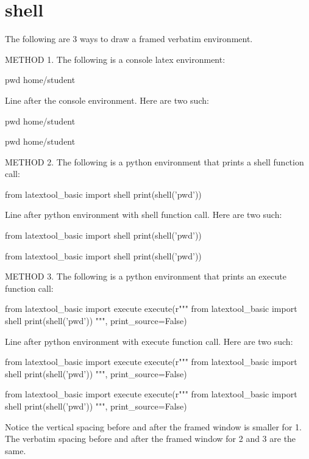 \section{shell}

The following are 3 ways to draw a framed verbatim environment.

METHOD 1.
The following is a console latex environment:
\begin{console}
 pwd
home/student
\end{console}
Line after the console environment.
Here are two such:
\begin{console}
 pwd
home/student
\end{console}
\begin{console}
 pwd
home/student
\end{console}


METHOD 2.
The following is a python environment that prints a shell function call:
\begin{python}
from latextool_basic import shell
print(shell('pwd'))
\end{python}
Line after python environment with shell function call.
Here are two such:
\begin{python}
from latextool_basic import shell
print(shell('pwd'))
\end{python}
\begin{python}
from latextool_basic import shell
print(shell('pwd'))
\end{python}

METHOD 3.
The following is a python environment that prints an execute function call:
\begin{python}
from latextool_basic import execute
execute(r"""
from latextool_basic import shell
print(shell('pwd'))
""", print_source=False)
\end{python}
Line after python environment with execute function call.
Here are two such:
\begin{python}
from latextool_basic import execute
execute(r"""
from latextool_basic import shell
print(shell('pwd'))
""", print_source=False)
\end{python}
\begin{python}
from latextool_basic import execute
execute(r"""
from latextool_basic import shell
print(shell('pwd'))
""", print_source=False)
\end{python}


Notice the vertical spacing before and after the framed window is smaller
for 1. 
The verbatim spacing before and after the framed window for 2 and 3 are
the same.


